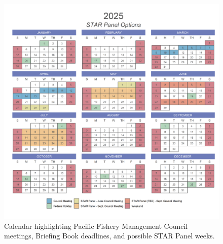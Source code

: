\documentclass[11pt,
  english,
  a4paper,
]{article}
\begin{document}
\begin{figure}
\centering
\includegraphics[width=1\textwidth,height=1\textheight]{figs/2025_calender.png}
\caption{Calendar highlighting Pacific Fishery Management Council meetings, Briefing Book deadlines, and possible STAR Panel weeks.\label{fig:calendar}}
\end{figure}
\end{document}
